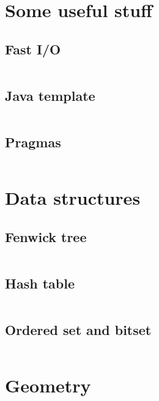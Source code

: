 \documentclass{article}
\begin{document}
\tableofcontents

\newpage

\section{Some useful stuff}
\subsection{Fast I/O}
\inputminted[mathescape, breaklines, breakafter=(, tabsize=2, frame=lines, showtabs, tab=|\ , tabcolor=lightgray]{c++}{./basic/fast-io/io.cpp}
\subsection{Java template}
\inputminted[mathescape, breaklines, breakafter=(, tabsize=2, frame=lines, showtabs, tab=|\ , tabcolor=lightgray]{java}{./basic/java-template/Template.java}
\subsection{Pragmas}
\inputminted[mathescape, breaklines, breakafter=(, tabsize=2, frame=lines, showtabs, tab=|\ , tabcolor=lightgray]{c++}{./basic/pragmas/opt.cpp}
\section{Data structures}
\subsection{Fenwick tree}
\inputminted[mathescape, breaklines, breakafter=(, tabsize=2, frame=lines, showtabs, tab=|\ , tabcolor=lightgray]{c++}{./data-structures/fenwick/fenwick.cpp}
\subsection{Hash table}
\inputminted[mathescape, breaklines, breakafter=(, tabsize=2, frame=lines, showtabs, tab=|\ , tabcolor=lightgray]{c++}{./data-structures/hash-table/hash-table.cpp}
\subsection{Ordered set and bitset}
\inputminted[mathescape, breaklines, breakafter=(, tabsize=2, frame=lines, showtabs, tab=|\ , tabcolor=lightgray]{c++}{./data-structures/std/std.cpp}
\section{Geometry}
\end{document}
